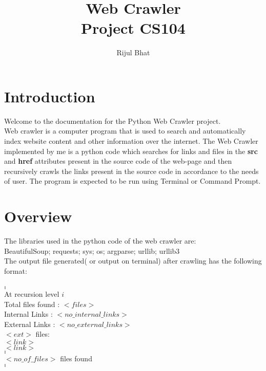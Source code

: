 \documentclass{article}
\begin{document}

\title{\textbf{Web Crawler\\ Project CS104}}
\date{}
\author{Rijul Bhat}
\maketitle
\tableofcontents
\clearpage
\pagestyle{fancy}
\section{Introduction}
Welcome to the documentation for the Python Web Crawler project.\\
Web crawler is a computer program that is used to search and automatically index website content and other information over the internet. The Web Crawler implemented by me is a python code which searches for links and files in the \textbf{src} and \textbf{href} attributes present in the source code of the web-page and then recursively crawls the links present in the source code in accordance to the needs of user. The program is expected to be run using Terminal or Command Prompt.

\section{Overview}
The libraries used in the python code of the web crawler are: \\
BeautifulSoup; requests; sys; os; argparse; urllib; urllib3 \\ 
The output file generated( or output on terminal) after crawling has the following format: \\ \\
$.$ \\
$.$ \\
$.$ \\ 
At recursion level $i$ \\
Total files found : $<files>$ \\
Internal Links : $<no\_internal\_links>$ \\
External Links : $<no\_external\_links>$ \\
$<ext>$ files: \\
$<link>$ \\
$<link>$ \\
$.$ \\
$.$ \\
$.$ \\ 
$<no\_of\_files>$ files found \\
$.$ \\
$.$ \\
$.$ \\ 
\end{document}
